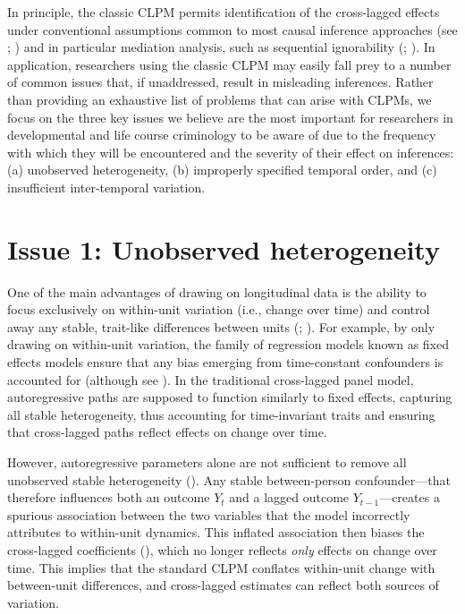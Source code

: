 \documentclass[
  letterpaper,
  DIV=11,
  numbers=noendperiod]{scrartcl}
\begin{document}
In principle, the classic CLPM permits identification of the
cross-lagged effects under conventional assumptions common to most
causal inference approaches (see
;
) and in
particular mediation analysis, such as sequential ignorability
(; ). In application, researchers using the classic
CLPM may easily fall prey to a number of common issues that, if
unaddressed, result in misleading inferences. Rather than providing an
exhaustive list of problems that can arise with CLPMs, we focus on the
three key issues we believe are the most important for researchers in
developmental and life course criminology to be aware of due to the
frequency with which they will be encountered and the severity of their
effect on inferences: (a) unobserved heterogeneity, (b) improperly
specified temporal order, and (c) insufficient inter-temporal variation.

\section{Issue 1: Unobserved
heterogeneity}\label{issue-1-unobserved-heterogeneity}

One of the main advantages of drawing on longitudinal data is the
ability to focus exclusively on within-unit variation (i.e., change over
time) and control away any stable, trait-like differences between units
(;
). For example, by only drawing on within-unit variation, the
family of regression models known as fixed effects models ensure that
any bias emerging from time-constant confounders is accounted for
(although see ). In the
traditional cross-lagged panel model, autoregressive paths are supposed
to function similarly to fixed effects, capturing all stable
heterogeneity, thus accounting for time-invariant traits and ensuring
that cross-lagged paths reflect effects on change over time.

However, autoregressive parameters alone are not sufficient to remove
all unobserved stable heterogeneity
(). Any
stable between-person confounder---that therefore influences both an
outcome \(Y_t\) and a lagged outcome \(Y_{t-1}\)---creates a spurious
association between the two variables that the model incorrectly
attributes to within-unit dynamics. This inflated association then
biases the cross-lagged coefficients
(),
which no longer reflects \emph{only} effects on change over time. This
implies that the standard CLPM conflates within-unit change with
between-unit differences, and cross-lagged estimates can reflect both
sources of variation.
\end{document}
